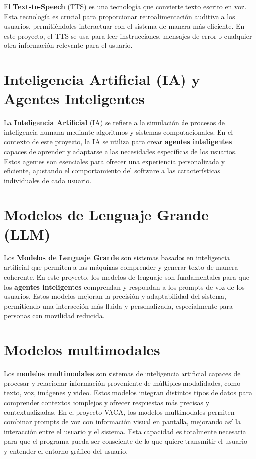 El \textbf{Text-to-Speech} (TTS) es una tecnología que convierte texto escrito en voz. Esta tecnología es crucial para proporcionar retroalimentación auditiva a los usuarios, permitiéndoles interactuar con el sistema de manera más eficiente. En este proyecto, el TTS se usa para leer instrucciones, mensajes de error o cualquier otra información relevante para el usuario.


\section{Inteligencia Artificial (IA) y Agentes Inteligentes}

La \textbf{Inteligencia Artificial} (IA) se refiere a la simulación de procesos de inteligencia humana mediante algoritmos y sistemas computacionales. En el contexto de este proyecto, la IA se utiliza para crear \textbf{agentes inteligentes} capaces de aprender y adaptarse a las necesidades específicas de los usuarios. Estos agentes son esenciales para ofrecer una experiencia personalizada y eficiente, ajustando el comportamiento del software a las características individuales de cada usuario.

\section{Modelos de Lenguaje Grande (LLM)}

Los \textbf{Modelos de Lenguaje Grande} son sistemas basados en inteligencia artificial que permiten a las máquinas comprender y generar texto de manera coherente. En este proyecto, los modelos de lenguaje son fundamentales para que los \textbf{agentes inteligentes} comprendan y respondan a los prompts de voz de los usuarios. Estos modelos mejoran la precisión y adaptabilidad del sistema, permitiendo una interacción más fluida y personalizada, especialmente para personas con movilidad reducida.

\section{Modelos multimodales}

Los \textbf{modelos multimodales} son sistemas de inteligencia artificial capaces de procesar y relacionar información proveniente de múltiples modalidades, como texto, voz, imágenes y video. Estos modelos integran distintos tipos de datos para comprender contextos complejos y ofrecer respuestas más precisas y contextualizadas. En el proyecto VACA, los modelos multimodales permiten combinar prompts de voz con información visual en pantalla, mejorando así la interacción entre el usuario y el sistema. Esta capacidad es totalmente necesaria para que el programa pueda ser consciente de lo que quiere transmitir el usuario y entender el entorno gráfico del usuario.

